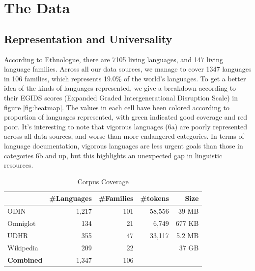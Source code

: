 \section{The Data}\label{sec:data}

\subsection{Representation and Universality} \label{sec:stats}

According to Ethnologue, there are 7105 living languages, and 147 living language families. Across all our data sources, we manage to cover 1347 languages in 106 families, which represents 19.0\% of the world's languages. To get a better idea of the kinds of languages represented, we give a breakdown according to their EGIDS scores (Expanded Graded Intergenerational Disruption Scale) in figure \ref{fig:heatmap}. The values in each cell have been colored according to proportion of languages represented, with green indicated good coverage and red poor. It's interesting to note that vigorous languages (6a) are poorly represented across all data sources, and worse than more endangered categories. In terms of language documentation, vigorous languages are less urgent goals than those in categories 6b and up, but this highlights an unexpected gap in linguistic resources.


\begin{table}[h!]
\small
\centering
    \begin{tabular}{l|rr|rr}
    ~         				& \#Languages & \#Families 	&\#tokens		& Size	\\ \hline
    ODIN      				& 1,217      & 101       		& 58,556		& 39 MB		\\
    Omniglot  				& 134        & 21        		&	6,749			& 677 KB	\\
    UDHR      				& 355        & 47        		&	33,117		& 5.2 MB	\\
    Wikipedia 				& 209        & 22       		&						& 37 GB		\\ \hline
    \textbf{Combined}	& 1,347			 & 106 
    \end{tabular}
\caption{Corpus Coverage}
\label{table:corpus}
\end{table}

